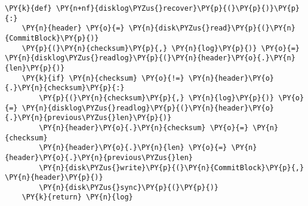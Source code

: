 \begin{BVerbatim}[commandchars=\\\{\}]
\PY{k}{def} \PY{n+nf}{disklog\PYZus{}recover}\PY{p}{(}\PY{p}{)}\PY{p}{:}
    \PY{n}{header} \PY{o}{=} \PY{n}{disk\PYZus{}read}\PY{p}{(}\PY{n}{CommitBlock}\PY{p}{)}
    \PY{p}{(}\PY{n}{checksum}\PY{p}{,} \PY{n}{log}\PY{p}{)} \PY{o}{=} \PY{n}{disklog\PYZus{}readlog}\PY{p}{(}\PY{n}{header}\PY{o}{.}\PY{n}{len}\PY{p}{)} 
    \PY{k}{if} \PY{n}{checksum} \PY{o}{!=} \PY{n}{header}\PY{o}{.}\PY{n}{checksum}\PY{p}{:}
        \PY{p}{(}\PY{n}{checksum}\PY{p}{,} \PY{n}{log}\PY{p}{)} \PY{o}{=} \PY{n}{disklog\PYZus{}readlog}\PY{p}{(}\PY{n}{header}\PY{o}{.}\PY{n}{previous\PYZus{}len}\PY{p}{)} 
        \PY{n}{header}\PY{o}{.}\PY{n}{checksum} \PY{o}{=} \PY{n}{checksum}
        \PY{n}{header}\PY{o}{.}\PY{n}{len} \PY{o}{=} \PY{n}{header}\PY{o}{.}\PY{n}{previous\PYZus{}len}
        \PY{n}{disk\PYZus{}write}\PY{p}{(}\PY{n}{CommitBlock}\PY{p}{,} \PY{n}{header}\PY{p}{)}
        \PY{n}{disk\PYZus{}sync}\PY{p}{(}\PY{p}{)}
    \PY{k}{return} \PY{n}{log}
\end{BVerbatim}
